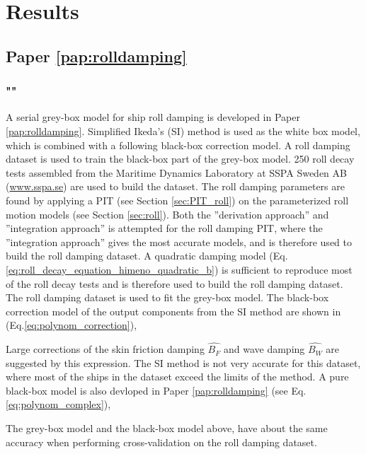 \chapter{Results\label{ch:results}}

\section{Paper \ref{pap:rolldamping}}
\subsection*{""}
A serial grey-box model for ship roll damping is developed in Paper \ref{pap:rolldamping}. Simplified Ikeda's (SI) method \cite{kawahara_simple_2011} is used as the white box model, which is combined with a following black-box correction model.
A roll damping dataset is used to train the black-box part of the grey-box model.
250 roll decay tests assembled from the Maritime Dynamics Laboratory at SSPA Sweden AB (\href{www.sspa.se}{www.sspa.se}) are used to build the dataset. The roll damping parameters are found by applying a PIT (see Section \ref{sec:PIT_roll}) on the parameterized roll motion models (see Section \ref{sec:roll}).
Both the ''derivation approach'' and ''integration approach'' is attempted for the roll damping PIT, where the ''integration approach'' gives the most accurate models, and is therefore used to build the roll damping dataset. A quadratic damping model (Eq.\ref{eq:roll_decay_equation_himeno_quadratic_b}) is sufficient to reproduce most of the roll decay tests and is therefore used to build the roll damping dataset. 
The roll damping dataset is used to fit the grey-box model. The black-box correction model of the output components from the SI method are shown in (Eq.\ref{eq:polynom_correction}),


\noindent Large corrections of the skin friction damping $\hat{B_F}$ and wave damping $\hat{B_W}$ are suggested by this expression. The SI method is not very accurate for this dataset, where most of the ships in the dataset exceed the limits of the method. A pure black-box model is also devloped in Paper \ref{pap:rolldamping} (see Eq.\ref{eq:polynom_complex}),


\noindent The grey-box model and the black-box model above, have about the same accuracy when performing cross-validation on the roll damping dataset.

